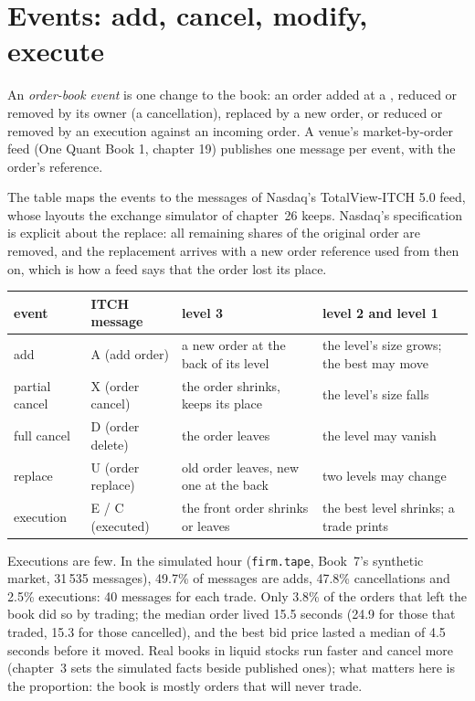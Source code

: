 \section{Events: add, cancel, modify, execute}

\begin{definition}\label{def:mx:the-limit-order-book:event}
An \emph{order-book event} is one change to the book: an order added at a , reduced or removed by its owner
(a cancellation), replaced by a new order, or reduced or removed by an execution against an incoming order. A venue's market-by-order feed
(One Quant Book 1, chapter 19) publishes one message per event, with the order's reference.
\end{definition}

The table maps the events to the messages of Nasdaq's TotalView-ITCH 5.0 feed, whose layouts the exchange simulator
of chapter~26 keeps. Nasdaq's specification is explicit about the replace: all remaining shares of the original order are removed, and the
replacement arrives with a new order reference used from then on, which is how a feed says that the order lost its place.

\begin{center}
\small
\begin{tabular}{@{}llp{4.3cm}p{4.3cm}@{}}
\toprule
event & ITCH message & level 3 & level 2 and level 1 \\
\midrule
add & A (add order) & a new order at the back of its level & the level's size grows; the best may move \\
partial cancel & X (order cancel) & the order shrinks, keeps its place & the level's size falls \\
full cancel & D (order delete) & the order leaves & the level may vanish \\
replace & U (order replace) & old order leaves, new one at the back & two levels may change \\
execution & E / C (executed) & the front order shrinks or leaves & the best level shrinks; a trade prints \\
\bottomrule
\end{tabular}
\end{center}

Executions are few. In the simulated hour (\texttt{firm.tape}, Book~7's synthetic market, 31\,535 messages), 49.7\% of messages are adds,
47.8\% cancellations and 2.5\% executions: 40 messages for each trade. Only 3.8\% of the orders that left the book did so by trading; the median
order lived 15.5 seconds (24.9 for those that traded, 15.3 for those cancelled), and the best bid price lasted a median of 4.5 seconds before it
moved. Real books in liquid stocks run faster and cancel more (chapter~3 sets the simulated facts beside published ones); what matters here is the
proportion: the book is mostly orders that will never trade.

